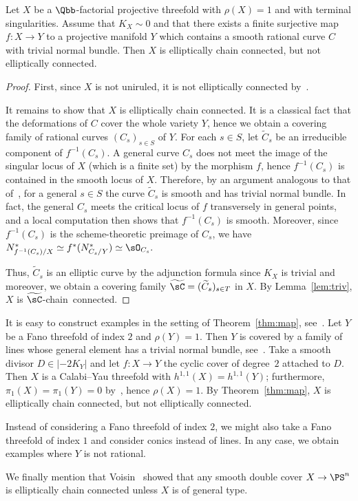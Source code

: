 \begin{theo}\label{thm:map}
Let $X$ be a $\Qbb$-factorial projective threefold with $\rho(X) = 1$ and with terminal singularities. Assume that $K_X\sim0$ and that there exists a finite surjective map $f\colon X \to Y$ to a projective manifold $Y$ which contains a smooth rational curve $C$ with trivial normal bundle. Then $X$ is elliptically chain connected, but not elliptically connected.
\end{theo}

\begin{proof}
First, since $X$ is not uniruled, it is not elliptically connected by~\cite[Theorem~6.2]{Gou16}.

It remains to show that $X$ is elliptically chain connected. It is a classical fact that the deformations of $C$ cover the whole variety $Y$, hence we obtain a covering family of rational curves $(C_s)_{s \in S}$ of $Y$. For each $s\in S$, let $\widetilde C_s $ be an irreducible component of $f^{-1}(C_s)$. A general curve $C_s$ does not meet the image of the singular locus of $X$ (which is a finite set) by the morphism $f$, hence $f^{-1}(C_s)$ is contained in the smooth locus of $X$. Therefore, by an argument analogous to that of~\cite[Lemma~2.2.3]{Ame04}, for a general $s\in S$ the curve $\widetilde C_s$ is smooth and has trivial normal bundle. In fact, the general $C_s$ meets the critical locus of $f$ transversely in general points, and a local computation then shows that $f^{-1}(C_s)$ is smooth. Moreover, since $f^{-1}(C_s)$ is the scheme-theoretic preimage of $C_s$, we have $N^*_{f^{-1}(C_s)/X} \simeq f^*(N^*_{C_s/Y}) \simeq \sO_{C_s}.$

Thus, $\widetilde C_s$ is an elliptic curve by the adjunction formula since $K_X$ is trivial and moreover, we obtain a covering family $\widetilde{\sC}=(\widetilde C_s)_{s \in T}$ in $X$. By Lemma~\ref{lem:triv}, $X$ is $\widetilde{\sC}$-chain~connected.
\end{proof}

\begin{exem}\label{ex}
It is easy to construct examples in the setting of Theorem~\ref{thm:map}, see~\cite[Theorem~1]{Cy03}. Let $Y$ be a Fano threefold of index $2$ and $\rho(Y) = 1$. Then $Y$ is covered by a family of lines whose general element has a trivial normal bundle, see~\cite[Chapter~3]{IP99}. Take a smooth divisor $D \in | {-}2K_Y |$ and let $f\colon X \to Y$ the cyclic cover of degree~$2$ attached to $D$. Then $X$ is a Calabi--Yau threefold with $h^{1,1}(X) = h^{1,1}(Y)$; furthermore, $\pi_1(X) = \pi_1(Y) = 0 $ by~\cite{Cor81}, hence $\rho(X)=1$. By Theorem~\ref{thm:map}, $X$ is elliptically chain connected, but not elliptically connected.

Instead of considering a Fano threefold of index $2$, we might also take a Fano threefold of index $1$ and consider conics instead of lines. In any case, we obtain examples where $Y$ is not rational.

We finally mention that Voisin~\cite[Example~2.17]{Voi03} showed that any smooth double cover $X \to \PS^n$ is elliptically chain connected unless $X$ is of general type.
\end{exem}

